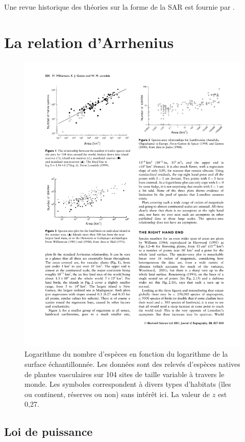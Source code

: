 \documentclass[
  11pt,
  french,
  a4paper,
  extrafontsizes,onecolumn,openright
  ]{memoir}
\newlength{\rf}
\begin{document}
Une revue historique des théories sur la forme de la SAR est fournie par \textcite{McGuinness1984}.

\hypertarget{sec-Arrhenius}{%
\section{La relation d'Arrhenius}\label{sec-Arrhenius}}



\scriptsize

\begin{figure}

{\centering \includegraphics[width=0.8\linewidth]{images/Williamson2001} 

}

\caption{Logarithme du nombre d'espèces en fonction du logarithme de la surface échantillonnée. Les données sont des relevés d'espèces natives de plantes vasculaires sur 104 sites de taille variable à travers le monde. Les symboles correspondent à divers types d'habitats (îles ou continent, réserves ou non) sans intérêt ici. La valeur de \(z\) est 0,27.}\label{fig:Williamson2001}
\end{figure}

\normalsize

\hypertarget{loi-de-puissance}{%
\subsection{Loi de puissance}\label{loi-de-puissance}}
\end{document}

